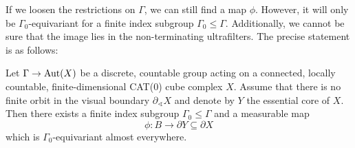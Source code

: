 If we loosen the restrictions on \(\Gamma\), we can still find a map \(\phi\). However, it will only be \(\Gamma_0\)-equivariant for a finite index subgroup \(\Gamma_0 \leq \Gamma\). Additionally, we cannot be sure that the image lies in the non-terminating ultrafilters. The precise statement is as follows:

\begin{cor}
  \label{cor:4.2}
  Let \(\Gamma \to \operatorname{Aut}(X)\) be a discrete, countable group acting on a connected, locally countable, finite-dimensional CAT(0) cube complex \(X\). Assume that there is no finite orbit in the visual boundary \(\partial_\sphericalangle X\) and denote by \(Y\) the essential core of \(X\). Then there exists a finite index subgroup \(\Gamma_0 \leq \Gamma\) and a measurable map
  \[
    \phi \colon B \to \partial Y \subseteq \partial X
  \]
  which is \(\Gamma_0\)-equivariant almost everywhere.
\end{cor}


